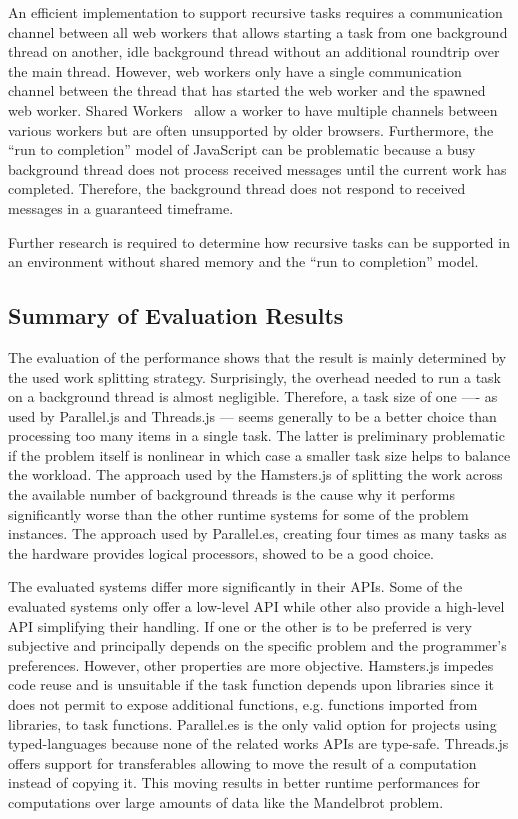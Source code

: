 An efficient implementation to support recursive tasks requires a communication channel between all web workers that allows starting a task from one background thread on another, idle background thread without an additional roundtrip over the main thread. However, web workers only have a single communication channel between the thread that has started the web worker and the spawned web worker. Shared Workers~\cite[section 4.6.4]{w3cWebWorker} allow a worker to have multiple channels between various workers but are often unsupported by older browsers. Furthermore, the \enquote{run to completion} model of JavaScript can be problematic because a busy background thread does not process received messages until the current work has completed. Therefore, the background thread does not respond to received messages in a guaranteed timeframe.

Further research is required to determine how recursive tasks can be supported in an environment without shared memory and the \enquote{run to completion} model.

\subsection{Summary of Evaluation Results}
The evaluation of the performance shows that the result is mainly determined by the used work splitting strategy. Surprisingly, the overhead needed to run a task on a background thread is almost negligible. Therefore, a task size of one ---- as used by Parallel.js and Threads.js --- seems generally to be a better choice than processing too many items in a single task. The latter is preliminary problematic if the problem itself is nonlinear in which case a smaller task size helps to balance the workload. The approach used by the Hamsters.js of splitting the work across the available number of background threads is the cause why it performs significantly worse than the other runtime systems for some of the problem instances. The approach used by Parallel.es, creating four times as many tasks as the hardware provides logical processors, showed to be a good choice. 

The evaluated systems differ more significantly in their APIs. Some of the evaluated systems only offer a low-level API while other also provide a high-level API simplifying their handling. If one or the other is to be preferred is very subjective and principally depends on the specific problem and the programmer's preferences. However, other properties are more objective. Hamsters.js impedes code reuse and is unsuitable if the task function depends upon libraries since it does not permit to expose additional functions, e.g. functions imported from libraries, to task functions. Parallel.es is the only valid option for projects using typed-languages because none of the related works APIs are type-safe. Threads.js offers support for transferables allowing to move the result of a computation instead of copying it. This moving results in better runtime performances for computations over large amounts of data like the Mandelbrot problem.



